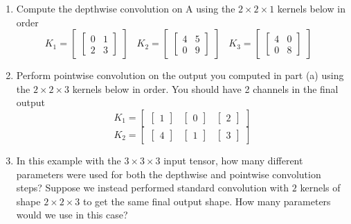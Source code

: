 \documentclass{article}
\begin{document}
\begin{enumerate}[label=(\alph*)]
    \item Compute the depthwise convolution on A using the $2 \times 2 \times 1$ kernels below in order
    \[K_1 = 
        \begin{bmatrix}
        \begin{bmatrix}
            0 & 1 \\
            2 & 3
        \end{bmatrix}
        \end{bmatrix}
        \;\;\;
      K_2 = 
      \begin{bmatrix}
      \begin{bmatrix}
            4 & 5 \\
            0 & 9
        \end{bmatrix}
        \end{bmatrix}
        \;\;\;
      K_3 = 
      \begin{bmatrix}
      \begin{bmatrix}
            4 & 0 \\
            0 & 8
        \end{bmatrix}
        \end{bmatrix}
        \;\;\;  
    \]
    \item Perform pointwise convolution on the output you computed in part (a) using the $2 \times 2 \times 3$ kernels below in order. You should have 2 channels in the final output
    \[K_1 = 
        \begin{bmatrix}
        \begin{bmatrix}
            1
        \end{bmatrix}
        &
        \begin{bmatrix}
            0
        \end{bmatrix}
        &
        \begin{bmatrix}
            2
        \end{bmatrix}
        \end{bmatrix}
    \]
    \[K_2 = 
        \begin{bmatrix}
        \begin{bmatrix}
            4
        \end{bmatrix} 
        &
        \begin{bmatrix}
            1
        \end{bmatrix}
        &
        \begin{bmatrix}
            3
        \end{bmatrix}
        \end{bmatrix}
    \]
    \item In this example with the $3 \times 3 \times 3$ input tensor, how many different parameters were used for both the depthwise and pointwise convolution steps? Suppose we instead performed standard convolution with $2$ kernels of shape $2 \times 2 \times 3$ to get the same final output shape. How many parameters would we use in this case?


\end{enumerate}
\end{document}
